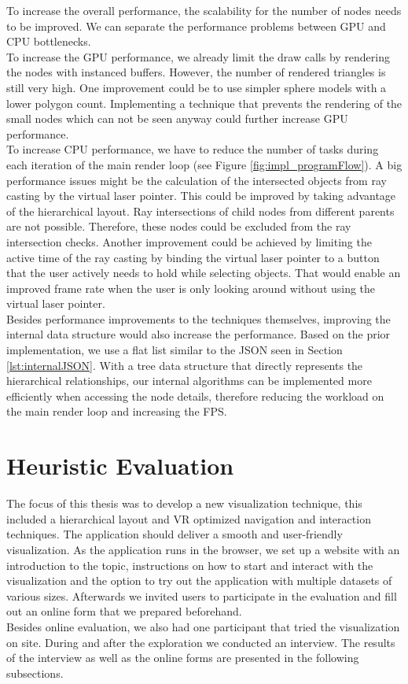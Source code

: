 To increase the overall performance, the scalability for the number of nodes needs to be improved. We can separate the performance problems between GPU and CPU bottlenecks.
\\
To increase the GPU performance, we already limit the draw calls by rendering the nodes with instanced buffers.
However, the number of rendered triangles is still very high. 
One improvement could be to use simpler sphere models with a lower polygon count. Implementing a technique that prevents the rendering of the small nodes which can not be seen anyway could further increase GPU performance.
\\
To increase CPU performance, we have to reduce the number of tasks during each iteration of the main render loop (see Figure \ref{fig:impl_programFlow}).
A big performance issues might be the calculation of the intersected objects from ray casting by the virtual laser pointer. This could be improved by taking advantage of the hierarchical layout.
Ray intersections of child nodes from different parents are not possible. Therefore, these nodes could be excluded from the ray intersection checks. 
Another improvement could be achieved by limiting the active time of the ray casting by binding the virtual laser pointer to a button that the user actively needs to hold while selecting objects. 
That would enable an improved frame rate when the user is only looking around without using the virtual laser pointer.
\\
Besides performance improvements to the techniques themselves, improving the internal data structure would also increase the performance. Based on the prior implementation, we use a flat list similar to the JSON seen in Section \ref{lst:internalJSON}. With a tree data structure that directly represents the hierarchical relationships, our internal algorithms can be implemented more efficiently when accessing the node details, therefore reducing the workload on the main render loop and increasing the FPS.

\section{Heuristic Evaluation}
\label{sec:heuristicEvaluation}

The focus of this thesis was to develop a new visualization technique, this included a hierarchical layout and VR optimized navigation and interaction techniques.
The application should deliver a smooth and user-friendly visualization.
As the application runs in the browser, we set up a website \cite{thesisWebsite} with an introduction to the topic, instructions on how to start and interact with the visualization and the option to try out the application with multiple datasets of various sizes. Afterwards we invited users to participate in the evaluation and fill out an online form that we prepared beforehand.
\\
Besides online evaluation, we also had one participant that tried the visualization on site. During and after the exploration we conducted an interview.
The results of the interview as well as the online forms are presented in the following subsections.
\\
   
